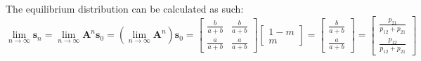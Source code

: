 \documentclass[a4paper]{article}
\newcommand{\vv}{\mathbf}
\begin{document}
The equilibrium distribution can be calculated as such:
\[\lim\limits_{n\to\infty}\vv s_n=\lim\limits_{n\to\infty}\vv A^n\vv s_0
=\left(\lim\limits_{n\to\infty}\vv A^n\right)\vv s_0
=\begin{bmatrix}\frac b{a+b}&\frac b{a+b}\\\frac a{a+b}&\frac a{a+b}\end{bmatrix}
\begin{bmatrix}1-m\\m\end{bmatrix}
=\begin{bmatrix}\frac b{a+b}\\\frac a{a+b}\end{bmatrix}
=\boxed{\begin{bmatrix}\frac {p_{21}}{p_{12}+p_{21}}\\\frac {p_{12}}{p_{12}+p_{21}}\end{bmatrix}}\]
\end{document}
